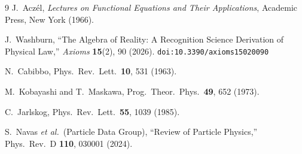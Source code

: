 \documentclass[12pt,a4paper]{article}
\theoremstyle{definition}
\theoremstyle{remark}
\begin{document}
\begin{thebibliography}{9}
  J.~Acz\'el, \emph{Lectures on Functional Equations and Their Applications},
  Academic Press, New York (1966).

  J.~Washburn, ``The Algebra of Reality: A Recognition Science Derivation
  of Physical Law,'' \emph{Axioms} \textbf{15}(2), 90 (2026).
  \texttt{doi:10.3390/axioms15020090}

  N.~Cabibbo, Phys.\ Rev.\ Lett.\ \textbf{10}, 531 (1963).

  M.~Kobayashi and T.~Maskawa, Prog.\ Theor.\ Phys.\ \textbf{49}, 652 (1973).

  C.~Jarlskog, Phys.\ Rev.\ Lett.\ \textbf{55}, 1039 (1985).

  S.~Navas \textit{et al.}\ (Particle Data Group),
  ``Review of Particle Physics,'' Phys.\ Rev.\ D \textbf{110}, 030001 (2024).
\end{thebibliography}
\end{document}
